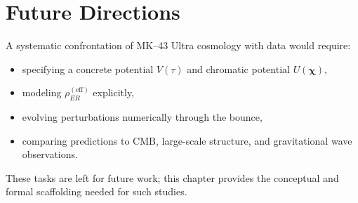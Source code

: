 \section{Future Directions}

A systematic confrontation of MK--43 Ultra cosmology with data would require:

\begin{itemize}
  \item specifying a concrete potential $V(\tau)$ and chromatic potential $U(\bm{\chi})$,
  \item modeling $\rho_{ER}^{\mathrm{(eff)}}$ explicitly,
  \item evolving perturbations numerically through the bounce,
  \item comparing predictions to CMB, large-scale structure, and gravitational wave observations.
\end{itemize}
These tasks are left for future work; this chapter provides the conceptual and formal scaffolding needed for such studies.
